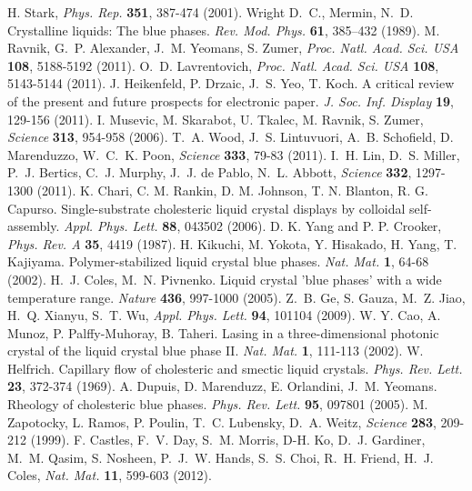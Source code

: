\documentclass[12pt]{article}
\begin{document}
\begin{thebibliography}{99}
 H. Stark, {\it Phys. Rep.} {\bf 351}, 387-474 (2001).
 Wright D.~C., Mermin, N.~D. Crystalline liquids: The blue phases. {\it Rev. Mod. Phys.} {\bf 61}, 385–432 (1989).
 M. Ravnik, G.~P. Alexander, J.~M. Yeomans,  
S. Zumer, {\it Proc. Natl. Acad. Sci. USA} {\bf 108}, 5188-5192 (2011).
 O.~D. Lavrentovich, {\it Proc. Natl. Acad. Sci.
USA} {\bf 108}, 5143-5144 (2011).
 J. Heikenfeld, P. Drzaic,  J.~S. Yeo, T. Koch.
A critical review of the present and future prospects for electronic paper.
{\it J. Soc. Inf. Display} {\bf 19}, 129-156 (2011).
 I. Musevic, M. Skarabot, U. Tkalec, M. Ravnik,
S. Zumer, {\it Science} {\bf 313}, 954-958 (2006).
 T.~A. Wood, J.~S. Lintuvuori, A.~B. Schofield, D. Marenduzzo,
W.~C.~K. Poon, {\it Science} {\bf 333}, 79-83 (2011).
 I.~H. Lin, D.~S. Miller, P.~J. Bertics, C.~J. Murphy, J.~J. de Pablo, N.~L. Abbott, {\it Science} {\bf 332}, 1297-1300 (2011).
 K. Chari, C. M. Rankin, D. M. Johnson, T. N. Blanton,
R. G. Capurso. Single-substrate cholesteric liquid crystal displays by colloidal self-assembly. {\it Appl. Phys. Lett.} {\bf 88}, 043502 (2006).
 D. K. Yang and P. P. Crooker, {\it Phys. Rev. A}
{\bf 35}, 4419 (1987).
 H. Kikuchi, M. Yokota, Y. Hisakado, H. Yang, T. Kajiyama.
Polymer-stabilized liquid crystal blue phases.
{\it Nat. Mat.} {\bf 1}, 64-68 (2002).
 H.~J. Coles, M.~N. Pivnenko.
Liquid crystal 'blue phases' with a wide temperature range.
{\it Nature} {\bf 436}, 997-1000 (2005).
 Z.~B. Ge, S. Gauza, M.~Z. Jiao, H.~Q. Xianyu, S.~T. Wu,
{\it Appl. Phys. Lett.} {\bf 94}, 101104 (2009).
 W. Y. Cao, A. Munoz, P. Palffy-Muhoray, B. Taheri.
Lasing in a three-dimensional photonic crystal of the liquid crystal blue 
phase II. {\it Nat. Mat.} {\bf 1}, 111-113 (2002).
 	W. Helfrich. Capillary flow of cholesteric
and smectic liquid crystals. {\it Phys. Rev. Lett.} {\bf 23}, 372-374 (1969).
 A. Dupuis, D. Marenduzz, E. Orlandini, J.~M. Yeomans.
Rheology of cholesteric blue phases. {\it Phys. Rev. Lett.} {\bf 95},
097801 (2005).
 M. Zapotocky, L. Ramos, P. Poulin, T.~C. Lubensky, 
D.~A. Weitz, {\it Science} {\bf 283}, 209-212 (1999).
 F. Castles, F.~V. Day, S.~M. Morris, D-H. Ko, D.~J. Gardiner, M.~M. Qasim, S. Nosheen, P.~J.~W. Hands, S.~S. Choi, R.~H. Friend, H.~J. Coles, {\it Nat. Mat.} {\bf 11}, 599-603 (2012).

\end{thebibliography}
\end{document}
